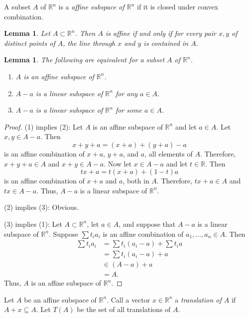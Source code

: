 \documentclass[12pt]{amsart}
\newtheorem{lemma}[theorem]{Lemma}
\theoremstyle{definition}
\theoremstyle{remark}
\numberwithin{equation}{section}
\newcommand{\RR}{\mathbb{R}}
\begin{document}
A subset $A$ of $\RR^n$ is a \emph{affine subspace of $\RR^n$}
if it is closed under convex combination.

\begin{lemma}
Let $A\subset \RR^n$.
Then $A$ is affine if and only if for every pair $x, y$ of distinct
points of $A$, the line through $x$ and $y$ is contained in $A$.
\end{lemma}

\begin{lemma}
    The following are equivalent for a subset $A$ of $\RR^n$.
    \begin{enumerate}
        \item $A$ is an affine subspace of $\RR^n$.
        \item $A - a$ is a linear subspace of $\RR^n$ for any $a\in A$.
        \item $A - a$ is a linear subspace of $\RR^n$ for some $a\in A$.
    \end{enumerate}
\end{lemma}

\begin{proof}
    (1) implies (2):
    Let $A$ is an affine subspace of $\RR^n$ and let $a\in A$.
    Let $x, y\in A - a$. Then
    \[
        x + y + a = (x + a) + (y + a) - a
    \]
    is an affine combination of $x+a$, $y+a$, and $a$, all elements
    of $A$. Therefore, $x+y+a\in A$ and $x+y\in A - a$.
    Now let $x\in A - a$ and let $t\in\RR$. Then
    \[
        tx + a = t(x + a) + (1 - t)a
    \]
    is an affine combination of $x+a$ and $a$, both in $A$.
    Therefore, $tx+a\in A$ and $tx\in A - a$.
    Thus, $A-a$ is a linear subspace of $\RR^n$.

    (2) implies (3): Obvious.

    (3) implies (1):
    Let $A\subset\RR^n$, let $a\in A$, and suppose that $A - a$
    is a linear subspace of $\RR^n$. 
    Suppose $\sum t_ia_i$ is an affine combination of
    $a_1,\ldots,a_n\in A$.
    Then
    \begin{align*}
        \sum t_ia_i &= \sum t_i(a_i - a) + \sum t_ia\\
        &= \sum t_i(a_i - a) + a\\
        &\in (A - a) + a\\
        &= A.
    \end{align*}
    Thus, $A$ is an affine subspace of $\RR^n$.
\end{proof}

Let $A$ be an affine subspace of $\RR^n$.
Call a vector $x\in\RR^n$ a \emph{translation of $A$} if
$A + x \subseteq A$. Let $T(A)$ be the set of all translations of $A$.
\end{document}
